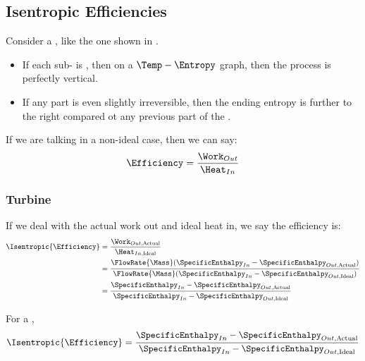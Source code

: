 \subsection{Isentropic Efficiencies}\label{subsec:Isentropic_Efficiencies}
Consider a , like the one shown in .
\begin{itemize}[noitemsep]
\item If each sub- is , then on a $\Temp-\Entropy$ graph, then the process is perfectly vertical.
\item If any part is even slightly irreversible, then the ending entropy is further to the right compared ot any previous part of the .
\end{itemize}

If we are talking in a non-ideal case, then we can say:
\begin{equation*}
  \Efficiency = \frac{\Work_{Out}}{\Heat_{In}}
\end{equation*}

\subsubsection{Turbine}\label{subsubsec:Turbine_Isentropic_Efficiency}
If we deal with the actual work out and ideal heat in, we say the  efficiency is:
\begin{align*}
  \Isentropic{\Efficiency} &= \frac{\Work_{Out, \text{Actual}}}{\Heat_{In, \text{Ideal}}} \\
                           &= \frac{\FlowRate{\Mass}(\SpecificEnthalpy_{In} - \SpecificEnthalpy_{Out, \text{Actual}})}{\FlowRate{\Mass} (\SpecificEnthalpy_{In} - \SpecificEnthalpy_{Out, \text{Ideal}})} \\
                           &= \frac{\SpecificEnthalpy_{In} - \SpecificEnthalpy_{Out, \text{Actual}}}{\SpecificEnthalpy_{In} - \SpecificEnthalpy_{Out, \text{Ideal}}}
\end{align*}

For a ,
\begin{equation}\label{eq:Isentropic_Efficiency-Turbine}
  \Isentropic{\Efficiency} = \frac{\SpecificEnthalpy_{In} - \SpecificEnthalpy_{Out, \text{Actual}}}{\SpecificEnthalpy_{In} - \SpecificEnthalpy_{Out, \text{Ideal}}}
\end{equation}

